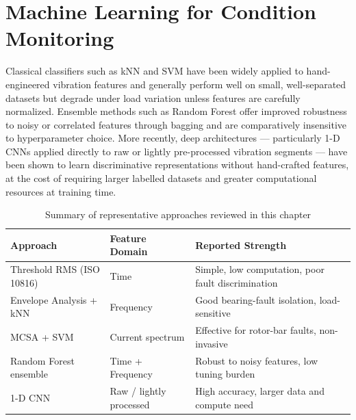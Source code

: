 \section{Machine Learning for Condition Monitoring}
Classical classifiers such as kNN and SVM have been widely applied to hand-engineered vibration
features and generally perform well on small, well-separated datasets but degrade under load
variation unless features are carefully normalized. Ensemble methods such as Random Forest offer
improved robustness to noisy or correlated features through bagging and are comparatively
insensitive to hyperparameter choice. More recently, deep architectures --- particularly 1-D
CNNs applied directly to raw or lightly pre-processed vibration segments --- have been shown to
learn discriminative representations without hand-crafted features, at the cost of requiring
larger labelled datasets and greater computational resources at training time.

\begin{table}[!ht]
\centering
\caption{Summary of representative approaches reviewed in this chapter}
\label{tab:litsummary}
\begin{tabularx}{\textwidth}{@{}l l X@{}}
\toprule
\textbf{Approach} & \textbf{Feature Domain} & \textbf{Reported Strength} \\
\midrule
Threshold RMS (ISO 10816) & Time & Simple, low computation, poor fault discrimination \\
Envelope Analysis + kNN   & Frequency & Good bearing-fault isolation, load-sensitive \\
MCSA + SVM                & Current spectrum & Effective for rotor-bar faults, non-invasive \\
Random Forest ensemble    & Time + Frequency & Robust to noisy features, low tuning burden \\
1-D CNN                   & Raw / lightly processed & High accuracy, larger data and compute need \\
\bottomrule
\end{tabularx}
\end{table}
